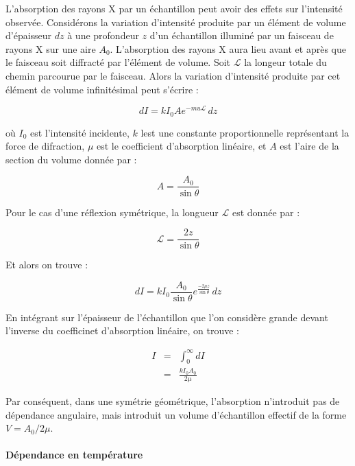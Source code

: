 L'absorption des rayons X par un échantillon peut avoir des effets sur l'intensité observée. Considérons la variation d'intensité produite par un élément de volume d'épaisseur $dz$ à une profondeur $z$ d'un échantillon illuminé par un faisceau de rayons X sur une aire $A_0$. L'absorption des rayons X aura lieu avant et après que le faisceau soit diffracté par l'élément de volume.
Soit $\mathcal{L}$ la longeur totale du chemin parcourue par le faisceau. Alors la variation d'intensité produite par cet élément de volume infinitésimal peut s'écrire :

\begin{equation}
    dI = kI_0 A e^{-mu \mathcal{L}}\,dz
\end{equation}

où $I_0$ est l'intensité incidente, $k$ lest une constante proportionnelle représentant la force de difraction, $\mu$ est le coefficient d'absorption linéaire, et $A$ est l'aire de la section du volume donnée par :

\begin{equation}
    A = \frac{A_0}{\sin \theta}
\end{equation}

Pour le cas d'une réflexion symétrique, la longueur $\mathcal{L}$ est donnée par :

\begin{equation}
    \mathcal{L} = \frac{2z}{\sin \theta}
\end{equation}

Et alors on trouve :

\begin{equation}
    dI = k I_0 \frac{A_0}{\sin \theta} e^{\frac{-2\mu z}{\sin \theta}}\, dz
\end{equation}

En intégrant sur l'épaisseur de l'échantillon que l'on considère grande devant l'inverse du coefficinet d'absorption linéaire, on trouve :

\begin{eqnarray}
    I & = & \int_0^\infty dI\\
    & = & \frac{k I_0A_0}{2 \mu}
\end{eqnarray}

Par conséquent, dans une symétrie géométrique, l'absorption n'introduit pas de dépendance angulaire, mais introduit un volume d'échantillon effectif de la forme $V = A_0 / 2\mu$.

\paragraph{Dépendance en température}

